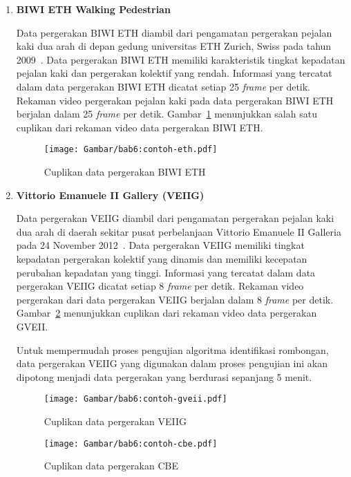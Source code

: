 \begin{enumerate}
    \item \textbf{BIWI ETH Walking Pedestrian}
    
    Data pergerakan BIWI ETH diambil dari pengamatan pergerakan pejalan kaki dua arah di depan gedung universitas ETH Zurich, Swiss pada tahun 2009~\cite{pellegrini:eth}. Data pergerakan BIWI ETH memiliki karakteristik tingkat kepadatan pejalan kaki dan pergerakan kolektif yang rendah. Informasi yang tercatat dalam data pergerakan BIWI ETH dicatat setiap 2\.5 \textit{frame} per detik. Rekaman video pergerakan pejalan kaki pada data pergerakan BIWI ETH berjalan dalam 25 \textit{frame} per detik. Gambar~\ref{bab6:contoh-eth} menunjukkan salah satu cuplikan dari rekaman video data pergerakan BIWI ETH.
    
    \begin{figure}[b!]
        \centering
        \texttt{[image: Gambar/bab6:contoh-eth.pdf]}
        \caption{Cuplikan data pergerakan BIWI ETH}
        \label{bab6:contoh-eth}
    \end{figure}
    
    \item \textbf{Vittorio Emanuele II Gallery (VEIIG)}
    
    Data pergerakan VEIIG diambil dari pengamatan pergerakan pejalan kaki dua arah di daerah sekitar pusat perbelanjaan Vittorio Emanuele II Galleria pada 24 November 2012~\cite{bandini:gveii}. Data pergerakan VEIIG memiliki tingkat kepadatan pergerakan kolektif yang dinamis dan memiliki kecepatan perubahan kepadatan yang tinggi. Informasi yang tercatat dalam data pergerakan VEIIG dicatat setiap 8 \textit{frame} per detik. Rekaman video pergerakan dari data pergerakan VEIIG berjalan dalam 8 \textit{frame} per detik. Gambar~\ref{bab6:contoh-gveii} menunjukkan cuplikan dari rekaman video data pergerakan GVEII.
    
    Untuk mempermudah proses pengujian algoritma identifikasi rombongan, data pergerakan VEIIG yang digunakan dalam proses pengujian ini akan dipotong menjadi data pergerakan yang berdurasi sepanjang 5 menit.
    
    \begin{figure}[h]
        \centering
        \texttt{[image: Gambar/bab6:contoh-gveii.pdf]}
        \caption{Cuplikan data pergerakan VEIIG}
        \label{bab6:contoh-gveii}
    \end{figure}
    
    \begin{figure}[b!]
        \centering
        \texttt{[image: Gambar/bab6:contoh-cbe.pdf]}
        \caption{Cuplikan data pergerakan CBE}
        \label{bab6:contoh-cbe}
    \end{figure}
    

\end{enumerate}
